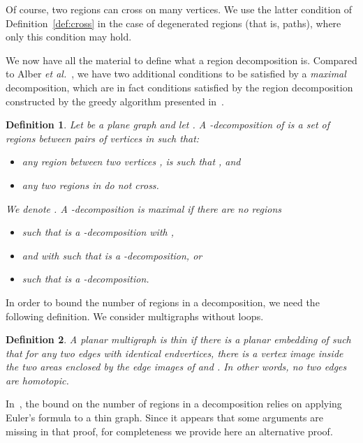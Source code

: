 \documentclass[a4paper,11pt]{article}
\newtheorem{defi} {Definition}
\begin{document}
Of course, two regions can cross on many vertices. We use the latter condition of Definition~\ref{def:cross} in the case of degenerated regions (that is, paths), where only this condition may hold.

We now have all the material to define what a region decomposition is. Compared to Alber \emph{et al.}~\cite[Definition 3]{AFN04}, we have two additional conditions to be satisfied by a \emph{maximal} decomposition, which are in fact conditions satisfied by the region decomposition constructed by the greedy algorithm presented in~\cite{AFN04}.

\begin{defi}\label{def:regionDec} Let  be a plane graph and let .
A \emph{-decomposition} of  is a set of regions  between pairs of vertices in  such that:
\begin{itemize}\itemsep0em
  \item any region  between two vertices ,  is such that , and
  \item any two regions in  do not cross.
\end{itemize}

We denote . A -decomposition is \emph{maximal} if there are no regions
\begin{itemize}
\item  such that  is a -decomposition with ,
\item   and  with  such that  is a -decomposition, or
\item   such that  is a -decomposition.
\end{itemize}

\end{defi}



In order to bound the number of regions in a decomposition, we need the following definition. We consider multigraphs without loops.

\begin{defi}\label{def:thin}
A planar multigraph  is \emph{thin} if there is a planar embedding of  such that for any two edges  with identical endvertices,
there is a vertex image inside the two areas enclosed by the edge images of  and . In other words, no two edges are homotopic.
\end{defi}

In~\cite[Lemma 5]{AFN04}, the bound on the number of regions in a decomposition relies on applying Euler's formula to a thin graph. Since it appears that some arguments are missing in that proof, for completeness we provide here an alternative proof.
\end{document}
